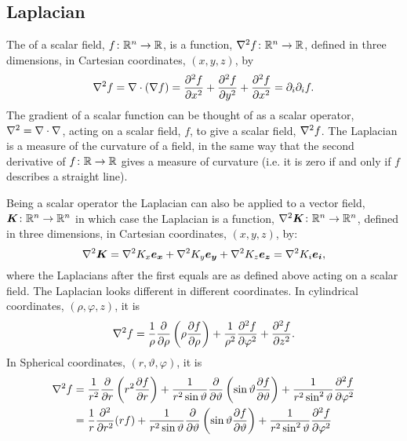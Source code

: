     \subsection{Laplacian}
    The  of a scalar field, \(f\colon\mathbb{R}^n\to\mathbb{R}\), is a function, \(\nabla^2 f\colon\mathbb{R}^n\to\mathbb{R}\), defined in three dimensions, in Cartesian coordinates, \((x, y, z)\), by
    \[\nabla^2 f = \nabla\cdot(\nabla f) = \pdv[2]{f}{x} + \pdv[2]{f}{y} + \pdv[2]{f}{x} = \partial_i\partial_i f.\]
    The gradient of a scalar function can be thought of as a scalar operator, \(\nabla^2 = \nabla\cdot\nabla\), acting on a scalar field, \(f\), to give a scalar field, \(\nabla^2 f\).
    The Laplacian is a measure of the curvature of a field, in the same way that the second derivative of \(f\colon\mathbb{R}\to\mathbb{R}\) gives a measure of curvature (i.e. it is zero if and only if \(f\) describes a straight line).
    
    Being a scalar operator the Laplacian can also be applied to a vector field, \(\bm{K}\colon\mathbb{R}^n\to\mathbb{R}^n\) in which case the Laplacian is a function, \(\nabla^2\bm{K}\colon\mathbb{R}^n\to\mathbb{R}^n\), defined in three dimensions, in Cartesian coordinates, \((x, y, z)\), by:
    \[\nabla^2\bm{K} = \nabla^2 K_x\bm{e_{x}} + \nabla^2 K_y\bm{e_{y}} + \nabla^2 K_z\bm{e_{z}} = \nabla^2 K_i\bm{e_{i}},\]
    where the Laplacians after the first equals are as defined above acting on a scalar field.
    The Laplacian looks different in different coordinates.
    In cylindrical coordinates, \((\rho, \varphi, z)\), it is
    \[\nabla^2 f = \frac{1}{\rho}\pdv{\rho}\left(\rho\pdv{f}{\rho}\right) + \frac{1}{\rho^2}\pdv[2]{f}{\varphi} + \pdv[2]{f}{z}.\]
    In Spherical coordinates, \((r, \vartheta, \varphi)\), it is
    \begin{align*}
        \nabla^2 f &= \frac{1}{r^2}\pdv{r}\left(r^2\pdv{f}{r}\right) + \frac{1}{r^2\sin\vartheta}\pdv{\vartheta}\left(\sin\vartheta \pdv{f}{\vartheta}\right) + \frac{1}{r^2\sin^2\vartheta}\pdv[2]{f}{\varphi}\\
        &= \frac{1}{r}\pdv[2]{r}(rf) + \frac{1}{r^2\sin\vartheta}\pdv{\vartheta}\left(\sin\vartheta \pdv{f}{\vartheta}\right) + \frac{1}{r^2\sin^2\vartheta}\pdv[2]{f}{\varphi}
    \end{align*}

